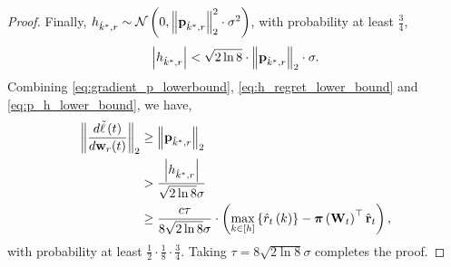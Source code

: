 \begin{proof}
Finally, $h_{\hat{k}^*,r} \sim {\mathcal{N}}\left( 0, \left\| {\mathbf{p}}_{\hat{k}^*, r} \right\|_2^2 \cdot \sigma^2 \right)$, with probability at least $\frac{3}{4}$,
\begin{equation}
\label{eq:p_h_lower_bound}
\begin{split}
	\left| h_{\hat{k}^*,r} \right| < \sqrt{2 \ln{8}} \cdot \left\| {\mathbf{p}}_{\hat{k}^*, r} \right\|_2 \cdot \sigma.
\end{split}
\end{equation}
Combining \cref{eq:gradient_p_lowerbound}, \cref{eq:h_regret_lower_bound} and \cref{eq:p_h_lower_bound}, we have,
\begin{equation*}
\begin{split}
	\left\| \frac{d\tilde{\ell}\left(t\right)}{d {\mathbf{w}}_r(t)} \right\|_2 &\ge \left\| {\mathbf{p}}_{\hat{k}^*, r}\right\|_2 \\
	&> \frac{\left| h_{\hat{k}^*,r} \right|}{\sqrt{2 \ln{8}} \sigma} \\
	&\ge \frac{c\tau}{8 \sqrt{2 \ln{8}} \sigma} \cdot \left( \max\limits_{k \in \left[h\right]}\left\{ \hat{r}_t\left(k\right) \right\} - {\boldsymbol{\pi}}\left( {\mathbf{W}}_t \right)^\top \hat{{\mathbf{r}}}_t  \right),
\end{split}
\end{equation*}
with probability at least $\frac{1}{2}  \cdot \frac{1}{8} \cdot \frac{3}{4} $. Taking $\tau = 8 \sqrt{2 \ln{8}} \sigma$ completes the proof.
\end{proof}


